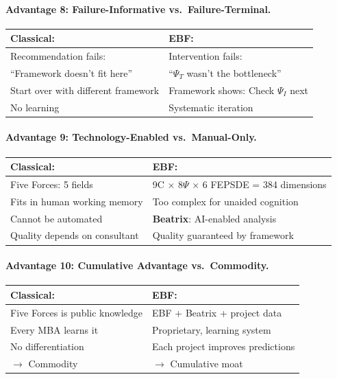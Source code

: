 \paragraph{Advantage 8: Failure-Informative vs.\ Failure-Terminal.}

\begin{center}
\begin{tabular}{@{}p{6.5cm}p{6.5cm}@{}}
\textbf{Classical:} & \textbf{EBF:} \\
\midrule
Recommendation fails: & Intervention fails: \\
``Framework doesn't fit here'' & ``$\Psi_T$ wasn't the bottleneck'' \\
Start over with different framework & Framework shows: Check $\Psi_I$ next \\
No learning & Systematic iteration \\
\end{tabular}
\end{center}

\paragraph{Advantage 9: Technology-Enabled vs.\ Manual-Only.}

\begin{center}
\begin{tabular}{@{}p{6.5cm}p{6.5cm}@{}}
\textbf{Classical:} & \textbf{EBF:} \\
\midrule
Five Forces: 5 fields & 9C $\times$ 8$\Psi$ $\times$ 6 FEPSDE = 384 dimensions \\
Fits in human working memory & Too complex for unaided cognition \\
Cannot be automated & \textbf{Beatrix}: AI-enabled analysis \\
Quality depends on consultant & Quality guaranteed by framework \\
\end{tabular}
\end{center}

\paragraph{Advantage 10: Cumulative Advantage vs.\ Commodity.}

\begin{center}
\begin{tabular}{@{}p{6.5cm}p{6.5cm}@{}}
\textbf{Classical:} & \textbf{EBF:} \\
\midrule
Five Forces is public knowledge & EBF + Beatrix + project data \\
Every MBA learns it & Proprietary, learning system \\
No differentiation & Each project improves predictions \\
$\rightarrow$ Commodity & $\rightarrow$ Cumulative moat \\
\end{tabular}
\end{center}


